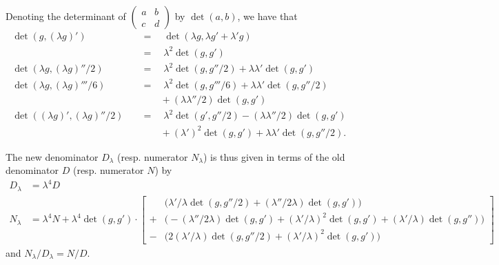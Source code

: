 \documentclass{report}
\theoremstyle{plain}
\theoremstyle{definition}
\newenvironment{env}[1]
    {\renewcommand\theinnercustomenv{#1}\innercustomenv}
    {\endinnercustomenv}
\newcommand{\detrow}[2]{\operatorname{det}(#1,#2)}
\begin{document}
\begin{env}{5.9}
\begin{enumerate}[(i)]
      Denoting the determinant of $\left(\begin{array}{cc}a&b\\c&d\end{array}\right)$ by $\detrow{a}{b}$, we have that
      \[
        \begin{aligned}
          \detrow{g}{(\lambda g)'}
          \quad&=\quad \detrow{\lambda g}{\lambda g'+\lambda' g}
        \\[0.5em]
          &=\quad \lambda^2\detrow{g}{g'}
        \\[1em]
          \detrow{\lambda g}{(\lambda g)''/2}
          \quad&=\quad \lambda^2\detrow{g}{g''/2}
          + \lambda\lambda'\detrow{g}{g'}
        \\[1em]
          \detrow{\lambda g}{(\lambda g)'''/6}
          \quad&=\quad \lambda^2\detrow{g}{g'''/6}
          + \lambda\lambda'\detrow{g}{g''/2}
        \\[0.5em]
          &\qquad+ (\lambda\lambda''/2)\detrow{g}{g'}
        \\[1em]
          \detrow{(\lambda g)'}{(\lambda g)''/2}
          \quad&=\quad \lambda^2\detrow{g'}{g''/2}
          - (\lambda\lambda''/2)\detrow{g}{g'}
        \\[0.5em]
          &\qquad+ (\lambda')^2\detrow{g}{g'}
          + \lambda\lambda'\detrow{g}{g''/2}.
        \end{aligned}
      \]

      The new denominator $D_\lambda$ (resp. numerator $N_\lambda$) is thus given in terms of the old denominator $D$ (resp. numerator $N$) by
      \[
        \begin{aligned}
          D_\lambda
          &= \lambda^4 D
        \\N_\lambda
          &= \lambda^4 N + \lambda^4\detrow{g}{g'}\cdot
          \left[
            \begin{aligned}
              &\Big(
                \lambda'/\lambda\detrow{g}{g''/2}
                + (\lambda''/2\lambda)\detrow{g}{g'}
              \Big)
            \\+&\Big(
                -(\lambda''/2\lambda)\detrow{g}{g'}
                +(\lambda'/\lambda)^2\detrow{g}{g'}
                +(\lambda'/\lambda)\detrow{g}{g''}
              \Big)
            \\-&\Big(
                2(\lambda'/\lambda)\detrow{g}{g''/2}
                + (\lambda'/\lambda)^2\detrow{g}{g'}
              \Big)
            \end{aligned}
          \right]
        \end{aligned}
      \]
      and $N_\lambda/D_\lambda=N/D$.


\end{enumerate}
\end{env}
\end{document}
